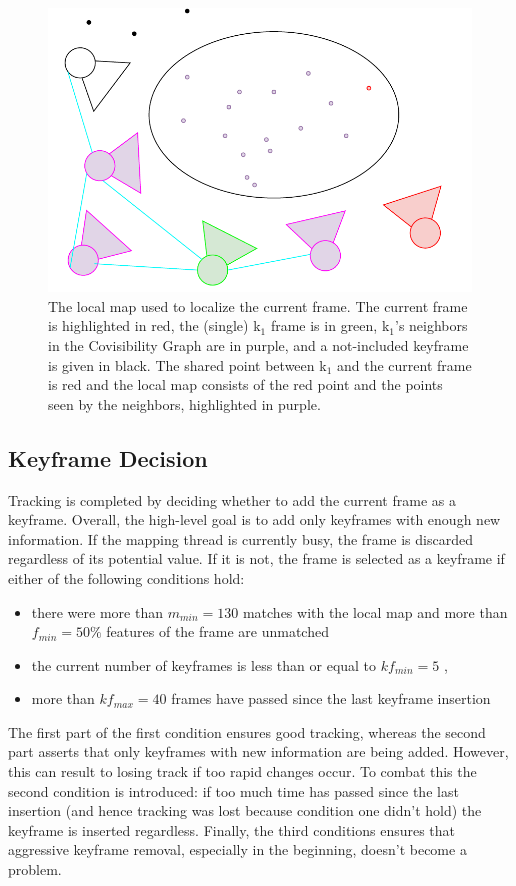 \documentclass[a4paper, 10pt]{article}
\begin{document}
\begin{figure}[htbp]
\centering
\includegraphics[width=0.5\linewidth]{./resources/local-map.pdf}
\caption{\label{fig:org6aba5f4}
The local map used to localize the current frame. The current frame is highlighted in red, the (single) k\(_{\text{1}}\) frame is in green, k\(_{\text{1}}\)'s neighbors in the Covisibility Graph are in purple, and a not-included keyframe is given in black. The shared point between k\(_{\text{1}}\) and the current frame is red and the local map consists of the red point and the points seen by the neighbors, highlighted in purple.}
\end{figure}

\subsection{Keyframe Decision}
\label{sec:org89c4cc2}
Tracking is completed by deciding whether to add the current frame as a keyframe. Overall, the high-level goal is to add only keyframes with enough new information.
If the mapping thread is currently busy, the frame is discarded regardless of its potential value. If it is not, the frame is selected as a keyframe if either of the following conditions hold:
\begin{itemize}
\item there were more than \(m_{min}=130\) matches with the local map and more than \(f_{min}=50\%\) features of the frame are unmatched
\item the current number of keyframes is less than or equal to \(kf_{min}=5\) ,
\item more than \(kf_{max}=40\) frames have passed since the last keyframe insertion
\end{itemize}
The first part of the first condition ensures good tracking, whereas the second part asserts that only keyframes with new information are being added.
However, this can result to losing track if too rapid changes occur. To combat this the second condition is introduced: if too much time has passed since the last insertion (and hence tracking was lost because condition one didn't
hold) the keyframe is inserted regardless. Finally, the third conditions ensures that aggressive keyframe removal, especially in the beginning, doesn't become a problem.
\end{document}
